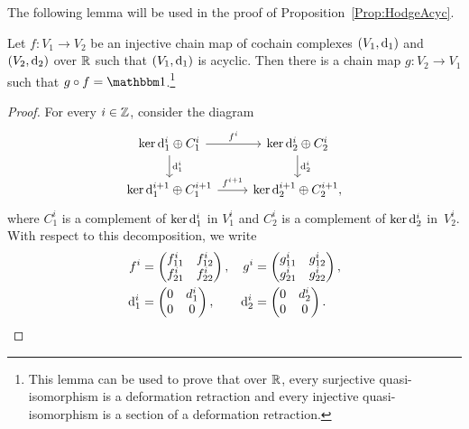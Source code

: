 \documentclass[\MainFolder/Text.tex]{subfiles}
\begin{document}
The following lemma will be used in the proof of Proposition~\ref{Prop:HodgeAcyc}.

\begin{Lemma}\label{Lem:Pom}
Let $f: V_1 \rightarrow V_2$ be an injective chain map of cochain complexes $(V_1,\mathrm{d}_1)$ and $(V_2,\mathrm{d}_2)$ over $\mathbb{R}$ such that $(V_1,\mathrm{d}_1)$ is acyclic. Then there is a chain map $g: V_2 \rightarrow V_1$ such that $g\circ f=\Id$.\footnote{This lemma can be used to prove that over $\mathbb{R}$, every surjective quasi-isomorphism is a deformation retraction and every injective quasi-isomorphism is a section of a deformation retraction.}
\end{Lemma}

\begin{proof}
For every $i\in \mathbb{Z}$, consider the diagram
$$\begin{tikzcd}
\Ker \Dd_1^i \oplus C^i_1 \arrow{r}{f^i} \arrow{d}{\Dd_1^i} & \Ker \Dd_2^i \oplus C^i_2 \arrow{d}{\Dd_2^i} \\
\Ker \Dd^{i+1}_1 \oplus C^{i+1}_1 \arrow{r}{f^{i+1}} & \Ker \Dd_2^{i+1} \oplus C^{i+1}_2,
\end{tikzcd}$$
where $C^i_1$ is a complement of $\operatorname{ker} \mathrm{d}_1^i$ in $V_1^i$ and $C^i_2$ is a complement of $\operatorname{ker} \mathrm{d}_2^i$ in~$V_2^i$. With respect to this decomposition, we write
\begin{align*}
f^i & = \begin{pmatrix}
f^{i}_{11} & f^i_{12} \\
f^{i}_{21} & f^i_{22}
\end{pmatrix},  & g^i &= \begin{pmatrix}
g^{i}_{11} & g^i_{12} \\
g^{i}_{21} & g^i_{22}
\end{pmatrix}, \\
\mathrm{d}^i_1 &= \begin{pmatrix}
0 & d^i_1 \\
0 & 0
\end{pmatrix},& \mathrm{d}^i_2 &= \begin{pmatrix}
0 & d^i_2 \\
0 & 0
\end{pmatrix}.
\end{align*}


\end{proof}
\end{document}
